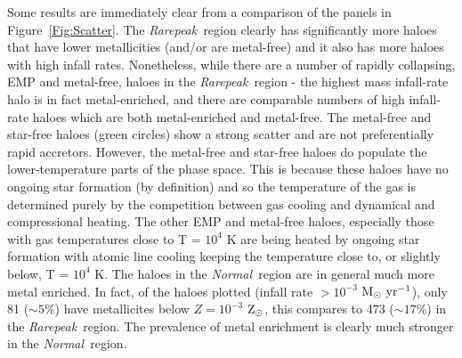 \documentclass[graphics, twocolumn, usenatbib]{mn2e}
\newcommand{\msolaryrc} {$\rm{M_{\odot}~yr^{-1}}$}
\newcommand{\zsolarc} {$\rm{Z_{\odot}}$}
\newcommand{\rarepeak} {\textit{Rarepeak~}}
\newcommand{\normal} {\textit{Normal~}}
\begin{document}
Some results are immediately clear from a comparison of the panels in Figure~\ref{Fig:Scatter}. The \rarepeak region clearly has significantly more haloes that have lower
metallicities (and/or are metal-free) and it also has more haloes
with high infall rates. Nonetheless, while there are a number of rapidly collapsing,
EMP and metal-free, haloes in the \rarepeak region - the highest mass infall-rate halo is in fact metal-enriched,
and there are comparable numbers of high infall-rate haloes which are both metal-enriched and metal-free.
The metal-free and star-free haloes (green circles) show a strong scatter and are not preferentially
rapid accretors. However, the metal-free and star-free haloes do populate the lower-temperature parts of the
phase space. This is because these haloes have no ongoing star formation (by definition) and so
the temperature of the gas is determined purely by the competition between gas cooling and
dynamical and compressional heating. The other EMP and metal-free haloes, especially those with gas temperatures
close to T = $10^4$ K are being heated by ongoing star formation with atomic line
cooling keeping the temperature close to, or slightly below, T = $10^4$ K. 
The haloes in the \normal region are in general much more metal enriched. In fact, of
the haloes
plotted (infall rate $> 10^{-3}$ \msolaryrc), only 81 ($\sim 5$\%)  have metallicites below  $Z = 10^{-3}$ \zsolarc, this compares to 
473 ($\sim 17$\%) in the \rarepeak region. The prevalence of metal enrichment is clearly much stronger in
the \normal region.
\end{document}
